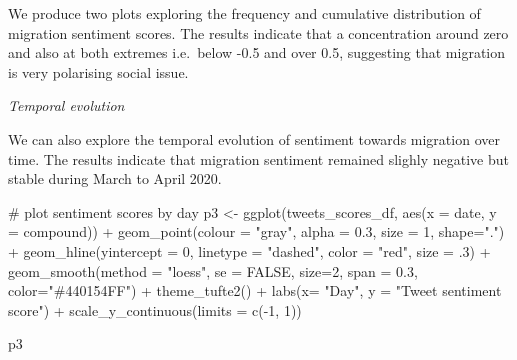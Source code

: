 \documentclass[
  letterpaper,
  DIV=11,
  numbers=noendperiod]{scrreprt}
\newenvironment{Shaded}{\begin{snugshade}}{\end{snugshade}}
\newcommand{\AttributeTok}[1]{\textcolor[rgb]{0.40,0.45,0.13}{#1}}
\newcommand{\CommentTok}[1]{\textcolor[rgb]{0.37,0.37,0.37}{#1}}
\newcommand{\ConstantTok}[1]{\textcolor[rgb]{0.56,0.35,0.01}{#1}}
\newcommand{\DecValTok}[1]{\textcolor[rgb]{0.68,0.00,0.00}{#1}}
\newcommand{\FloatTok}[1]{\textcolor[rgb]{0.68,0.00,0.00}{#1}}
\newcommand{\FunctionTok}[1]{\textcolor[rgb]{0.28,0.35,0.67}{#1}}
\newcommand{\NormalTok}[1]{\textcolor[rgb]{0.00,0.23,0.31}{#1}}
\newcommand{\OtherTok}[1]{\textcolor[rgb]{0.00,0.23,0.31}{#1}}
\newcommand{\SpecialCharTok}[1]{\textcolor[rgb]{0.37,0.37,0.37}{#1}}
\newcommand{\StringTok}[1]{\textcolor[rgb]{0.13,0.47,0.30}{#1}}
\begin{document}
We produce two plots exploring the frequency and cumulative distribution
of migration sentiment scores. The results indicate that a concentration
around zero and also at both extremes i.e.~below -0.5 and over 0.5,
suggesting that migration is very polarising social issue.

\emph{Temporal evolution}

We can also explore the temporal evolution of sentiment towards
migration over time. The results indicate that migration sentiment
remained slighly negative but stable during March to April 2020.

\begin{Shaded}
\begin{Highlighting}[]
\CommentTok{\# plot sentiment scores by day}
\NormalTok{p3 }\OtherTok{\textless{}{-}} \FunctionTok{ggplot}\NormalTok{(tweets\_scores\_df, }
             \FunctionTok{aes}\NormalTok{(}\AttributeTok{x =}\NormalTok{ date, }\AttributeTok{y =}\NormalTok{ compound)) }\SpecialCharTok{+}
 \FunctionTok{geom\_point}\NormalTok{(}\AttributeTok{colour =} \StringTok{"gray"}\NormalTok{, }\AttributeTok{alpha =} \FloatTok{0.3}\NormalTok{, }\AttributeTok{size =} \DecValTok{1}\NormalTok{, }\AttributeTok{shape=}\StringTok{"."}\NormalTok{) }\SpecialCharTok{+} 
  \FunctionTok{geom\_hline}\NormalTok{(}\AttributeTok{yintercept =} \DecValTok{0}\NormalTok{, }\AttributeTok{linetype =} \StringTok{"dashed"}\NormalTok{, }\AttributeTok{color =} \StringTok{"red"}\NormalTok{, }\AttributeTok{size =}\NormalTok{ .}\DecValTok{3}\NormalTok{) }\SpecialCharTok{+}
  \FunctionTok{geom\_smooth}\NormalTok{(}\AttributeTok{method =} \StringTok{"loess"}\NormalTok{, }\AttributeTok{se =} \ConstantTok{FALSE}\NormalTok{, }\AttributeTok{size=}\DecValTok{2}\NormalTok{, }\AttributeTok{span =} \FloatTok{0.3}\NormalTok{, }\AttributeTok{color=}\StringTok{"\#440154FF"}\NormalTok{) }\SpecialCharTok{+}
  \FunctionTok{theme\_tufte2}\NormalTok{() }\SpecialCharTok{+}
  \FunctionTok{labs}\NormalTok{(}\AttributeTok{x=} \StringTok{"Day"}\NormalTok{,}
       \AttributeTok{y =} \StringTok{"Tweet sentiment score"}\NormalTok{)  }\SpecialCharTok{+}
  \FunctionTok{scale\_y\_continuous}\NormalTok{(}\AttributeTok{limits =} \FunctionTok{c}\NormalTok{(}\SpecialCharTok{{-}}\DecValTok{1}\NormalTok{, }\DecValTok{1}\NormalTok{))}

\NormalTok{p3}
\end{Highlighting}
\end{Shaded}
\end{document}
